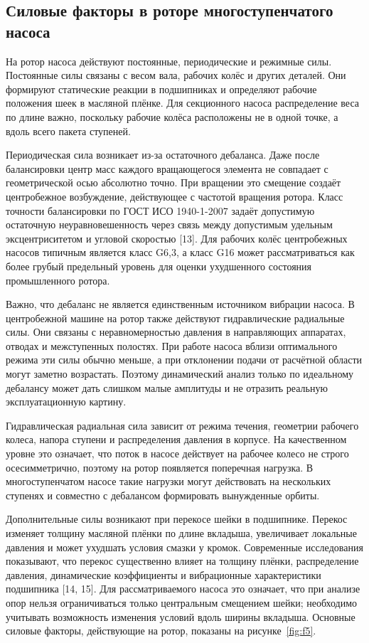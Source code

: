 \subsection{Силовые факторы в роторе многоступенчатого насоса}

На ротор насоса действуют постоянные, периодические и режимные силы. Постоянные силы связаны с весом вала, рабочих колёс и других деталей. Они формируют статические реакции в подшипниках и определяют рабочие положения шеек в масляной плёнке. Для секционного насоса распределение веса по длине важно, поскольку рабочие колёса расположены не в одной точке, а вдоль всего пакета ступеней.

Периодическая сила возникает из-за остаточного дебаланса. Даже после балансировки центр масс каждого вращающегося элемента не совпадает с геометрической осью абсолютно точно. При вращении это смещение создаёт центробежное возбуждение, действующее с частотой вращения ротора. Класс точности балансировки по ГОСТ ИСО 1940-1-2007 задаёт допустимую остаточную неуравновешенность через связь между допустимым удельным эксцентриситетом и угловой скоростью [13]. Для рабочих колёс центробежных насосов типичным является класс G6,3, а класс G16 может рассматриваться как более грубый предельный уровень для оценки ухудшенного состояния промышленного ротора.

Важно, что дебаланс не является единственным источником вибрации насоса. В центробежной машине на ротор также действуют гидравлические радиальные силы. Они связаны с неравномерностью давления в направляющих аппаратах, отводах и межступенных полостях. При работе насоса вблизи оптимального режима эти силы обычно меньше, а при отклонении подачи от расчётной области могут заметно возрастать. Поэтому динамический анализ только по идеальному дебалансу может дать слишком малые амплитуды и не отразить реальную эксплуатационную картину.

Гидравлическая радиальная сила зависит от режима течения, геометрии рабочего колеса, напора ступени и распределения давления в корпусе. На качественном уровне это означает, что поток в насосе действует на рабочее колесо не строго осесимметрично, поэтому на ротор появляется поперечная нагрузка. В многоступенчатом насосе такие нагрузки могут действовать на нескольких ступенях и совместно с дебалансом формировать вынужденные орбиты.

Дополнительные силы возникают при перекосе шейки в подшипнике. Перекос изменяет толщину масляной плёнки по длине вкладыша, увеличивает локальные давления и может ухудшать условия смазки у кромок. Современные исследования показывают, что перекос существенно влияет на толщину плёнки, распределение давления, динамические коэффициенты и вибрационные характеристики подшипника [14, 15]. Для рассматриваемого насоса это означает, что при анализе опор нельзя ограничиваться только центральным смещением шейки; необходимо учитывать возможность изменения условий вдоль ширины вкладыша. Основные силовые факторы, действующие на ротор, показаны на рисунке~\ref{fig:f5}.

